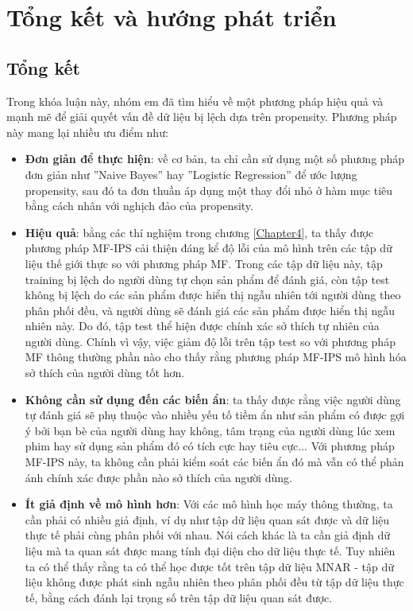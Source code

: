 \chapter{Tổng kết và hướng phát triển}
\label{Chapter5}

\section{Tổng kết}

Trong khóa luận này, nhóm em đã tìm hiểu về một phương pháp hiệu quả và mạnh mẽ để giải quyết vấn đề dữ liệu bị lệch dựa trên propensity. Phương pháp này mang lại nhiều ưu điểm như:
\begin{itemize}
    \item \textbf{Đơn giản để thực hiện}: về cơ bản, ta chỉ cần sử dụng một số phương pháp đơn giản như ''Naive Bayes'' hay ''Logistic Regression'' để ước lượng propensity, sau đó ta đơn thuần áp dụng một thay đổi nhỏ ở hàm mục tiêu bằng cách nhân với nghịch đảo của propensity.
    \item \textbf{Hiệu quả}: bằng các thí nghiệm trong chương \ref{Chapter4}, ta thấy được phương pháp MF-IPS cải thiện đáng kể độ lỗi của mô hình trên các tập dữ liệu thế giới thực so với phương pháp MF. Trong các tập dữ liệu này, tập training bị lệch do người dùng tự chọn sản phẩm để đánh giá, còn tập test không bị lệch do các sản phẩm được hiển thị ngẫu nhiên tới người dùng theo phân phối đều, và người dùng sẽ đánh giá các sản phẩm được hiển thị ngẫu nhiên này. Do đó, tập test thể hiện được chính xác sở thích tự nhiên của người dùng. Chính vì vậy, việc giảm độ lỗi trên tập test so với phương pháp MF thông thường phần nào cho thấy rằng phương pháp MF-IPS mô hình hóa sở thích của người dùng tốt hơn.
    \item \textbf{Không cần sử dụng đến các biến ẩn}: ta thấy được rằng việc người dùng tự đánh giá sẽ phụ thuộc vào nhiều yếu tố tiềm ẩn như sản phẩm có được gợi ý bởi bạn bè của người dùng hay không, tâm trạng của người dùng lúc xem phim hay sử dụng sản phẩm đó có tích cực hay tiêu  cực... Với phương pháp MF-IPS này, ta không cần phải kiểm soát các biến ẩn đó mà vẫn có thể phản ánh chính xác được phần nào sở thích của người dùng.
    \item \textbf{Ít giả định về mô hình hơn}: Với các mô hình học máy thông thường, ta cần phải có nhiều giả định, ví dụ như tập dữ liệu quan sát được và dữ liệu thực tế phải cùng phân phối với nhau. Nói cách khác là ta cần giả định dữ liệu mà ta quan sát được mang tính đại diện cho dữ liệu thực tế. Tuy nhiên ta có thể thấy rằng ta có thể học được tốt trên tập dữ liệu MNAR - tập dữ liệu không được phát sinh ngẫu nhiên theo phân phối đều từ tập dữ liệu thực tế, bằng cách đánh lại trọng số trên tập dữ liệu quan sát được. 
\end{itemize}

